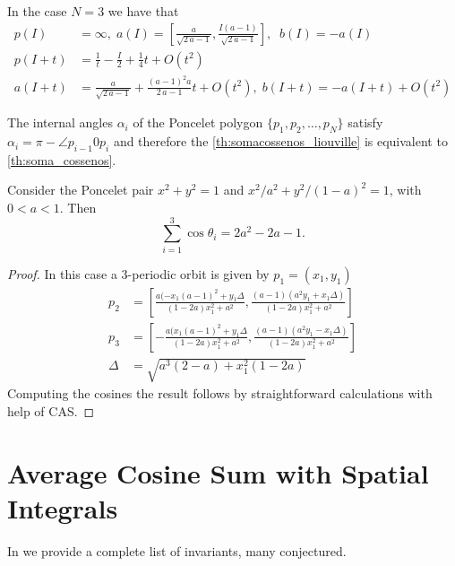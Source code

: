 \begin{example} In the case $N=3$ we have that
\begin{align*}
p(I)&= \infty , \; a(I)=[{ {\frac {a}{\sqrt {2\,a-1}}}},     {\frac {I(a-1)}{\sqrt {2\,a-1}}}],\;\; b(I)=-a(I)\\
p(I+t)&=\frac{1}{t} -{\frac {I}{2}}+{\frac{1}{4}}t+O \left( {t}^{2} \right)  \\
a(I+t)&= { {\frac {a}{\sqrt {2\,a-1}}}}+{\frac { \left( a-1 \right) ^{2}a}{2\,
a-1}}t+O \left( {t}^{2} \right), \; b(I+t)=-a(I+t)+O(t^2)
%
\end{align*}
\end{example}
\begin{remark}
The internal angles $\alpha_i$ of the Poncelet polygon $\{p_1,p_2,\ldots, p_N\}$ satisfy
$\alpha_i=\pi-\angle p_{i-1}0p_i$ and therefore the \cref{th:somacossenos_liouville} is equivalent to \cref{th:soma_cossenos}.
\end{remark}

\begin{proposition} Consider the Poncelet pair $x^2+y^2=1$ and $x^2/a^2+y^2/(1-a)^2=1$, with $0<a<1.$
Then \[\sum_{i=1}^3\cos\theta_i=2a^2-2a-1.\]
\end{proposition}

\begin{proof} In this case a 3-periodic orbit is given
by $p_1=(x_1,y_1)$
\begin{align*}
    p_2&=\left[\frac{ a(-x_1(a - 1)^2 + y_1\Delta } { (1-2a)x_1^2 + a^2  }, \frac{(a - 1)(a^2y_1 + x_1\Delta) }{  (1-2a)x_1^2 + a^2 }
\right]\\
p_3&=\left[-\frac{ a(x_1(a - 1)^2 + y_1\Delta } { (1-2a)x_1^2 + a^2  }, \frac{(a - 1)(a^2y_1 - x_1\Delta) }{  (1-2a)x_1^2 + a^2 }
\right]\\
\Delta&= \sqrt{a^3(2-a  ) + x_1^2(1-2a )}
\end{align*}
 Computing the cosines the result follows by straightforward calculations with  help of CAS.
\end{proof}
\section{Average Cosine Sum with Spatial Integrals}


In \cite{reznik2021-fifty-invariants} we provide a complete list of invariants, many conjectured.
